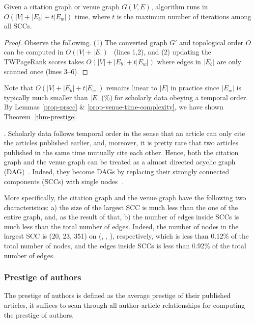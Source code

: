 \begin{lemma}
\label{prop-venue-time-complexity}
Given a citation graph or venue graph $G(V, E)$, algorithm \twprscc runs in  $O(|V|+|E_b|+t|E_w|)$ time, where $t$ is  the maximum number of iterations among all SCCs.
\end{lemma}

\begin{proof}
Observe the following. (1) The converted graph $G'$ and topological order $O$ can be computed in $O(|V|+|E|)$~\cite{CormenLRS01} (lines 1,2), and (2) updating the TWPageRank scores takes $O(|V|+|E_b|+t |E_w|)$ where edges in $|E_b|$ are only scanned once (lines 3--6).
\end{proof}

Note that $O(|V|+|E_b|+t |E_w|)$ remains linear to $|E|$ in practice since $|E_w|$ is typically much smaller than $|E|$ (\%) for scholarly data obeying a temporal order.
By Lemmas \ref{prop-prscc} \& \ref{prop-venue-time-complexity}, we have shown Theorem~\ref{thm-prestige}.


. Scholarly data follows temporal order in the sense that an article can only cite the articles published earlier, and, moreover, it is pretty rare that two articles published in the same time mutually cite each other.
Hence, both the citation graph and the venue graph can be treated as a almost directed acyclic graph (DAG)~\cite{ObjectRank04}. Indeed, they become DAGs by replacing their strongly connected components (SCCs) with single nodes~\cite{CormenLRS01}.

More specifically, the citation graph and the venue graph have the following two characteristics:
a) the size of the largest SCC is much less than the one of the entire graph,
and, as the result of that, b) the number of edges inside SCCs is much less than the total number of edges.
%
Indeed, the number of nodes in the largest SCC is (20, 23, 351) on (\aan, \aminer, \magdata), respectively, which is less than 0.12\% of the total number of nodes, and the edges inside SCCs is less than 0.92\% of the total number of edges.




\subsubsection{Prestige of authors}
\label{subsubsec-prs-A}
The prestige of authors is defined as the average prestige of their published articles, it suffices to scan through all author-article  relationships for computing the prestige of authors.


